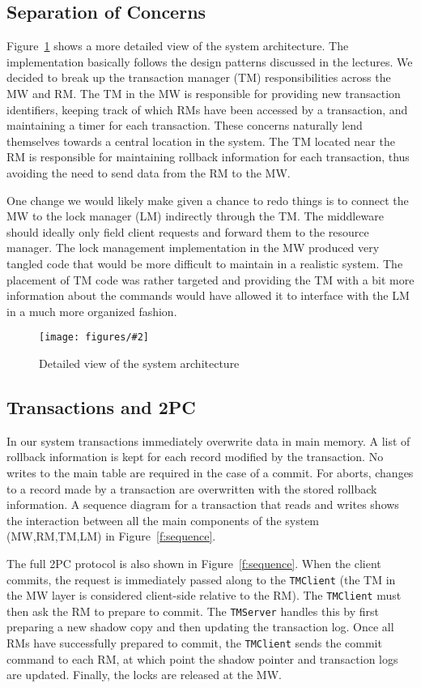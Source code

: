 \documentclass{article}
\newcommand{\addfigure}[4]{

\begin{figure}[h]
	\centering
	\texttt{[image: figures/\#2]}
	\caption{#3}
	\label{#4}
\end{figure}

}
\begin{document}
\subsection{Separation of Concerns}

Figure~\ref{f:system} shows a more detailed view of the system architecture. The implementation basically follows the design patterns discussed in the lectures. We decided to break up the transaction manager (TM) responsibilities across the MW and RM. The TM in the MW is responsible for providing new transaction identifiers, keeping track of which RMs have been accessed by a transaction, and maintaining a timer for each transaction. These concerns naturally lend themselves towards a central location in the system. The TM located near the RM is responsible for maintaining rollback information for each transaction, thus avoiding the need to send data from the RM to the MW.

One change we would likely make given a chance to redo things is to connect the MW to the lock manager (LM) indirectly through the TM. The middleware should ideally only field client requests and forward them to the resource manager. The lock management implementation in the MW produced very tangled code that would be more difficult to maintain in a realistic system. The placement of TM code was rather targeted and providing the TM with a bit more information about the commands would have allowed it to interface with the LM in a much more organized fashion. 


\addfigure{0.6}{system.pdf}{Detailed view of the system architecture}{f:system}

\subsection{Transactions and 2PC}

In our system transactions immediately overwrite data in main memory. A list of rollback information is kept for each record modified by the transaction. No writes to the main table are required in the case of a commit. For aborts, changes to a record made by a transaction are overwritten with the stored rollback information. A sequence diagram for a transaction that reads and writes shows the interaction between all the main components of the system (MW,RM,TM,LM) in Figure~\ref{f:sequence}.

The full 2PC protocol is also shown in Figure~\ref{f:sequence}. When the client commits, the request is immediately passed along to the \texttt{TMClient} (the TM in the MW layer is considered client-side relative to the RM). The \texttt{TMClient} must then ask the RM to prepare to commit. The \texttt{TMServer} handles this by first preparing a new shadow copy and then updating the transaction log. Once all RMs have successfully prepared to commit, the \texttt{TMClient} sends the commit command to each RM, at which point the shadow pointer and transaction logs are updated. Finally, the locks are released at the MW.
\end{document}
